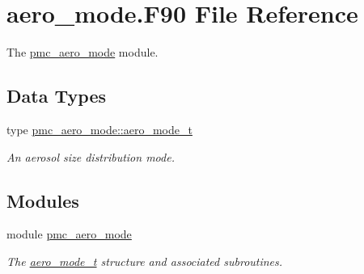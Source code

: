 \hypertarget{aero__mode_8_f90}{}\section{aero\+\_\+mode.\+F90 File Reference}
\label{aero__mode_8_f90}


The \mbox{\hyperlink{namespacepmc__aero__mode}{pmc\+\_\+aero\+\_\+mode}} module.  


\subsection*{Data Types}
\begin{DoxyCompactItemize}
\item 
type \mbox{\hyperlink{structpmc__aero__mode_1_1aero__mode__t}{pmc\+\_\+aero\+\_\+mode\+::aero\+\_\+mode\+\_\+t}}
\begin{DoxyCompactList}\small\item\em An aerosol size distribution mode. \end{DoxyCompactList}\end{DoxyCompactItemize}
\subsection*{Modules}
\begin{DoxyCompactItemize}
\item 
module \mbox{\hyperlink{namespacepmc__aero__mode}{pmc\+\_\+aero\+\_\+mode}}
\begin{DoxyCompactList}\small\item\em The \mbox{\hyperlink{structpmc__aero__mode_1_1aero__mode__t}{aero\+\_\+mode\+\_\+t}} structure and associated subroutines. \end{DoxyCompactList}\end{DoxyCompactItemize}

